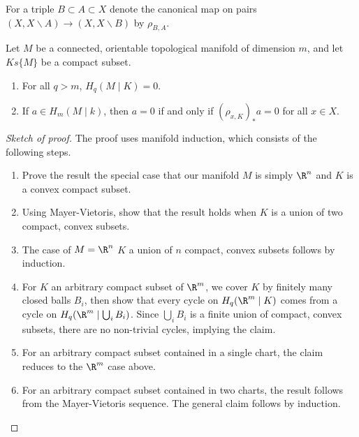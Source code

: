 \documentclass[main.tex]{subfiles}
\begin{document}
For a triple \(B \subset A \subset X\) denote the canonical map on pairs \((X, X\smallsetminus A) \to (X, X\smallsetminus B)\) by \(\rho_{B, A}\).

\begin{lemma}
  \label{lemma:manifold_induction_for_compacta}
  Let \(M\) be a connected, orientable topological manifold of dimension \(m\), and let \(K s\{ M\}\) be a compact subset.
  \begin{enumerate}
    \item For all \(q > m\), \(H_{q}(M \mid K) = 0\).

    \item If \(a \in H_{m}(M \mid k)\), then \(a = 0\) if and only if \((\rho_{x, K})_{*}a = 0\) for all \(x \in X\).
  \end{enumerate}
\end{lemma}
\begin{proof}[Sketch of proof]
  The proof uses manifold induction, which consists of the following steps.
  \begin{enumerate}
    \item Prove the result the special case that our manifold \(M\) is simply \(\R^{n}\) and \(K\) is a convex compact subset.

    \item Using Mayer-Vietoris, show that the result holds when \(K\) is a union of two compact, convex subsets.

    \item The case of \(M = \R^{n}\) \(K\) a union of \(n\) compact, convex subsets follows by induction.

    \item For \(K\) an arbitrary compact subset of \(\R^{m}\), we cover \(K\) by finitely many closed balls \(B_{i}\), then show that every cycle on \(H_{q}(\R^{m} \mid K)\) comes from a cycle on \( H_{q}(\R^{m} \mid \bigcup_{i} B_{i})\). Since \(\bigcup_{i} B_{i}\) is a finite union of compact, convex subsets, there are no non-trivial cycles, implying the claim.

    \item For an arbitrary compact subset contained in a single chart, the claim reduces to the \(\R^{m}\) case above.

    \item For an arbitrary compact subset contained in two charts, the result follows from the Mayer-Vietoris sequence. The general claim follows by induction.
  \end{enumerate}
\end{proof}
\end{document}
